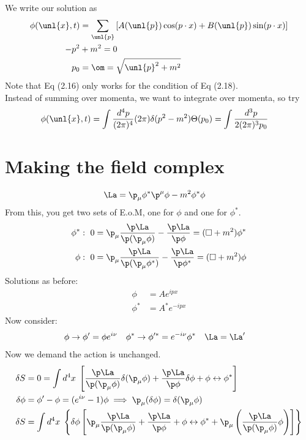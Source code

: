 \documentclass[a4paper, 11pt, normalem]{report}
\begin{document}
We write our solution as
\begin{align}
    \phi(\unl{x},t) &= \sum_{\unl{p}} \left[A(\unl{p})\cos(p\cdot x) + B(\unl{p})\sin(p\cdot x)\right] \\
    -p^2 &+ m^2 = 0 \\
    p_0 &= \om = \sqrt{\unl{p}^2 + m^2}
\end{align}
Note that Eq (2.16) only works for the condition of Eq (2.18).\\
Instead of summing over momenta, we want to integrate over momenta, so try
\begin{align}
    \phi(\unl{x},t) &= \int \frac{d^4p}{(2\pi)^4} (2\pi)\delta(p^2-m^2)\Theta(p_0) = \int \frac{d^3p}{2(2\pi)^3p_0}
\end{align}

\section{Making the field complex}
\begin{align}
    \La &= \p_\mu\phi^*\p^\mu\phi - m^2\phi^*\phi
\end{align}
From this, you get two sets of E.o.M, one for $\phi$ and one for $\phi^*$.
\begin{align}
    \phi^*:~ 0 &= \p_\mu\frac{\p\La}{\p(\p_\mu\phi)} - \frac{\p\La}{\p\phi} = (\Box+m^2)\phi^* \\
    \phi:~ 0 &= \p_\mu\frac{\p\La}{\p(\p_\mu\phi^*)} - \frac{\p\La}{\p\phi^*} = (\Box+m^2)\phi
\end{align}
Solutions as before:
\begin{align}
    \phi &= Ae^{ipx} \\
    \phi^* &= A^* e^{-ipx}
\end{align}
Now consider:
\begin{align}
    \phi &\to \phi' = \phi e^{i\nu} & \phi^* &\to \phi'^* = e^{-i\nu}\phi^* & \La &= \La'
\end{align}
Now we demand the action is unchanged.
\begin{align}
    \delta S &= 0 = \int d^4x\; \left[\frac{\p\La}{\p(\p_\mu\phi)} \delta(\p_\mu\phi) + \frac{\p\La}{\p\phi}\delta\phi + \phi\leftrightarrow\phi^*\right] \\
    \delta\phi &= \phi'-\phi = (e^{i\nu}-1)\phi \implies \p_\mu(\delta\phi) = \delta(\p_\mu\phi) \\
    \delta S &= \int d^4x\; \left\{\delta\phi\left[\p_\mu\frac{\p\La}{\p(\p_\mu\phi)} + \frac{\p\La}{\p\phi} + \phi\leftrightarrow\phi^* + \p_\mu\left(\frac{\p\La}{\p(\p_\mu\phi)}\phi\right)\right]\right\}
\end{align}
\end{document}
